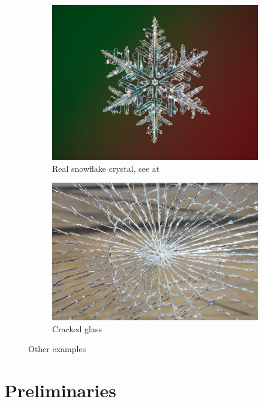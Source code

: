 \documentclass[12pt,a4paper]{scrartcl}
\numberwithin{equation}{subsection}
\newcommand{\1}{\mathbbm{1}}
\numberwithin{equation}{section}
\theoremstyle{definition}
\begin{document}
\begin{figure}[]
	\centering
	\begin{subfigure}[b]{.45\textwidth}
		\includegraphics[width=1\linewidth]{images/snowflake.jpg}
		\caption{Real snowflake crystal, see at \cite{snowflake}} 
	\end{subfigure}
	\begin{subfigure}[b]{.48\textwidth}
		\includegraphics[width=.8\linewidth]{images/glass-break.jpg}
		\caption{Cracked glass} 
	\end{subfigure}
	\caption{Other examples}
	\label{other}
\end{figure}




\newpage


\section{Preliminaries} \label{prelim}
\end{document}
